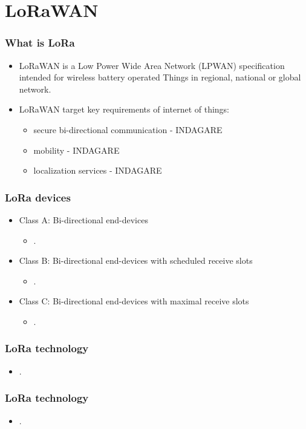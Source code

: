 \section{LoRaWAN}
  
\begin{frame}[fragile]
  \frametitle{What is LoRa}
  \begin{itemize}
      \item LoRaWAN is a Low Power Wide Area Network (LPWAN) specification intended for wireless battery operated Things in regional, national or global network. 
      \item LoRaWAN target key requirements of internet of things:
      \begin{itemize}
      	\item secure bi-directional communication - INDAGARE
      	\item mobility - INDAGARE
      	\item localization services - INDAGARE
      \end{itemize}
  \end{itemize}
\end{frame}

\begin{frame}[fragile]
  \frametitle{LoRa devices}
  \begin{itemize}
    \item Class A: Bi-directional end-devices
    \begin{itemize}
      \item .
    \end{itemize}
    \item Class B: Bi-directional end-devices with scheduled receive slots
    \begin{itemize}
      \item .
    \end{itemize}
    \item Class C: Bi-directional end-devices with maximal receive slots
    \begin{itemize}
      \item .
    \end{itemize}
  \end{itemize}
\end{frame}

\begin{frame}[fragile]
  \frametitle{LoRa technology}
  \begin{itemize}
      \item .
  \end{itemize}
\end{frame}

\begin{frame}[fragile]
  \frametitle{LoRa technology}
  \begin{itemize}
      \item .
  \end{itemize}
\end{frame}
